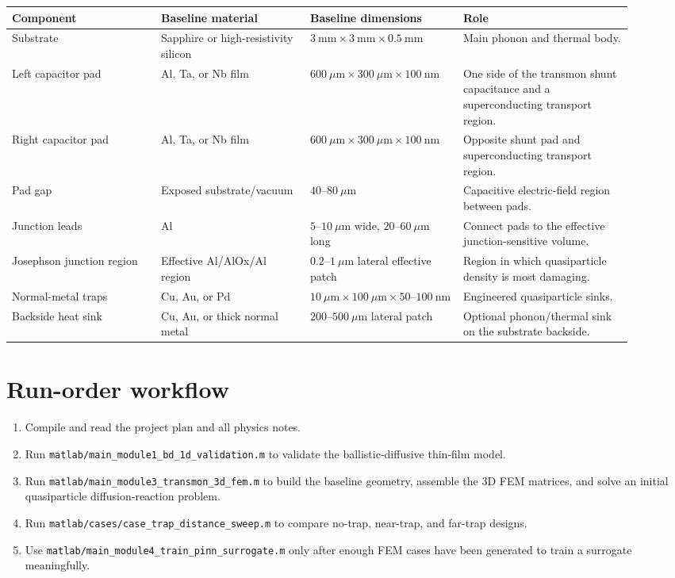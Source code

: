\documentclass[11pt]{article}
\begin{document}
\begin{longtable}{p{0.22\linewidth} p{0.22\linewidth} p{0.22\linewidth} p{0.25\linewidth}}
\toprule
\textbf{Component} & \textbf{Baseline material} & \textbf{Baseline dimensions} & \textbf{Role}\\
\midrule
Substrate & Sapphire or high-resistivity silicon & $3~\mathrm{mm}\times 3~\mathrm{mm}\times 0.5~\mathrm{mm}$ & Main phonon and thermal body.\\
Left capacitor pad & Al, Ta, or Nb film & $600~\mu\mathrm{m}\times 300~\mu\mathrm{m}\times 100~\mathrm{nm}$ & One side of the transmon shunt capacitance and a superconducting transport region.\\
Right capacitor pad & Al, Ta, or Nb film & $600~\mu\mathrm{m}\times 300~\mu\mathrm{m}\times 100~\mathrm{nm}$ & Opposite shunt pad and superconducting transport region.\\
Pad gap & Exposed substrate/vacuum & $40$--$80~\mu\mathrm{m}$ & Capacitive electric-field region between pads.\\
Junction leads & Al & $5$--$10~\mu\mathrm{m}$ wide, $20$--$60~\mu\mathrm{m}$ long & Connect pads to the effective junction-sensitive volume.\\
Josephson junction region & Effective Al/AlOx/Al region & $0.2$--$1~\mu\mathrm{m}$ lateral effective patch & Region in which quasiparticle density is most damaging.\\
Normal-metal traps & Cu, Au, or Pd & $10~\mu\mathrm{m}\times 100~\mu\mathrm{m}\times 50$--$100~\mathrm{nm}$ & Engineered quasiparticle sinks.\\
Backside heat sink & Cu, Au, or thick normal metal & $200$--$500~\mu\mathrm{m}$ lateral patch & Optional phonon/thermal sink on the substrate backside.\\
\bottomrule
\end{longtable}

\section{Run-order workflow}
\begin{enumerate}[leftmargin=1.6em]
    \item Compile and read the project plan and all physics notes.
    \item Run \texttt{matlab/main\_module1\_bd\_1d\_validation.m} to validate the ballistic-diffusive thin-film model.
    \item Run \texttt{matlab/main\_module3\_transmon\_3d\_fem.m} to build the baseline geometry, assemble the 3D FEM matrices, and solve an initial quasiparticle diffusion-reaction problem.
    \item Run \texttt{matlab/cases/case\_trap\_distance\_sweep.m} to compare no-trap, near-trap, and far-trap designs.
    \item Use \texttt{matlab/main\_module4\_train\_pinn\_surrogate.m} only after enough FEM cases have been generated to train a surrogate meaningfully.
\end{enumerate}
\end{document}
